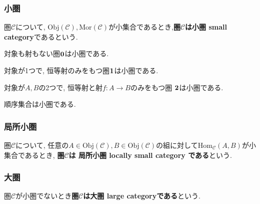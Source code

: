 \subsubsection{小圏}
\begin{Def}
圏$\mathscr{C}$について, $\mathrm{Obj}(\mathscr{C}),\mathrm{Mor}(\mathscr{C})$が小集合であるとき,{\bf 圏$\mathscr{C}$は小圏 small category}であるという.
\end{Def}
\begin{Prop}
対象も射もない圏${\bf 0}$は小圏である.
\end{Prop}
\begin{Prop}
対象が1つで, 恒等射のみをもつ圏${\bf 1}$は小圏である.
\end{Prop}
\begin{Prop}
対象が$A,B$の2つで, 
恒等射と射$f:A\rightarrow B$のみをもつ圏
${\bf 2}$は小圏である.
\end{Prop}
\begin{Prop}
順序集合は小圏である.
\end{Prop}
\subsubsection{局所小圏}
\begin{Def}
圏$\mathscr{C}$について, 任意の$A\in\mathrm{Obj}(\mathscr{C}),B\in\mathrm{Obj}(\mathscr{C})$の組に対して$\mathrm{Hom}_{\mathscr{C}}(A,B)$が小集合であるとき, {\bf 圏$\mathscr{C}$は 局所小圏 locally small category である}という.
\end{Def}
\subsubsection{大圏}
\begin{Def}
圏$\mathscr{C}$が小圏でないとき{\bf 圏$\mathscr{C}$は大圏 large categoryである}という.
\end{Def}


